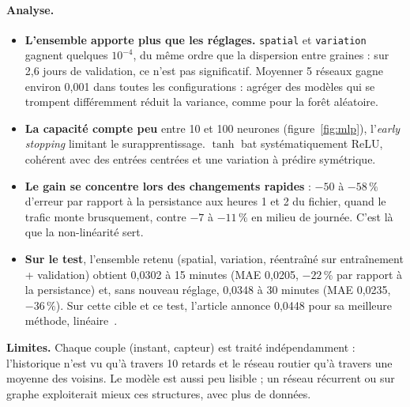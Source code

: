 \paragraph{Analyse.}
\begin{itemize}
  \item \textbf{L'ensemble apporte plus que les réglages.} \texttt{spatial} et \texttt{variation} gagnent quelques
  $10^{-4}$, du même ordre que la dispersion entre graines : sur 2,6 jours de validation, ce n'est pas significatif.
  Moyenner 5 réseaux gagne environ 0,001 dans toutes les configurations : agréger des modèles qui se trompent
  différemment réduit la variance, comme pour la forêt aléatoire.
  \item \textbf{La capacité compte peu} entre 10 et 100 neurones (figure~\ref{fig:mlp}), l'\emph{early stopping}
  limitant le surapprentissage. $\tanh$ bat systématiquement ReLU, cohérent avec des entrées centrées et une
  variation à prédire symétrique.
  \item \textbf{Le gain se concentre lors des changements rapides} : $-50$ à $-58\,\%$ d'erreur par rapport à la
  persistance aux heures 1 et 2 du fichier, quand le trafic monte brusquement, contre $-7$ à $-11\,\%$ en milieu de
  journée. C'est là que la non-linéarité sert.
  \item \textbf{Sur le test}, l'ensemble retenu (spatial, variation, réentraîné sur entraînement + validation) obtient
  0,0302 à 15 minutes (MAE 0,0205, $-22\,\%$ par rapport à la persistance) et, sans nouveau réglage, 0,0348 à
  30 minutes (MAE 0,0235, $-36\,\%$). Sur cette cible et ce test, l'article annonce 0,0448 pour sa meilleure
  méthode, linéaire~\cite{zhao2019}.
\end{itemize}
\textbf{Limites.} Chaque couple (instant, capteur) est traité indépendamment : l'historique n'est vu qu'à travers
10 retards et le réseau routier qu'à travers une moyenne des voisins. Le modèle est aussi peu lisible ; un réseau
récurrent ou sur graphe exploiterait mieux ces structures, avec plus de données.
